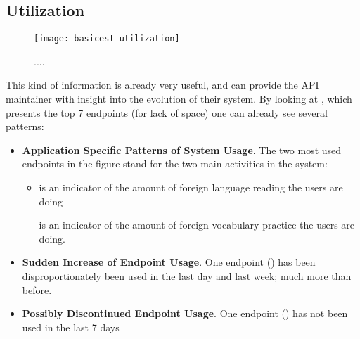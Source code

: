 

\newpage
\subsection{Utilization}
\label{sec:util}




  \begin{figure}[h!]
  \centering
  \texttt{[image: basicest-utilization]}
  \caption{....}
  \label{fig:basicest}
  \end{figure}

This kind of information is already very useful, and can provide the API maintainer with insight into the evolution of their system. By looking at , which presents the top 7 endpoints (for lack of space) one can already see several patterns: 

\begin{itemize}

  \item {\bf Application Specific Patterns of System Usage}. The two most used endpoints in the figure stand for the two main activities in the system: 

  \begin{itemize}

    \item \epTranslations is an indicator of the amount of foreign language reading the users are doing

    \epOutcome is an indicator of the amount of foreign vocabulary practice the users are doing.

  \end{itemize}

  \item {\bf Sudden Increase of Endpoint Usage}. One endpoint (\epUserActivity) has been disproportionately been used in the last day and last week; much more than before. 

  \item {\bf Possibly Discontinued Endpoint Usage}. One endpoint (\epFeedItems) has not been used in the last 7 days

\end{itemize}

